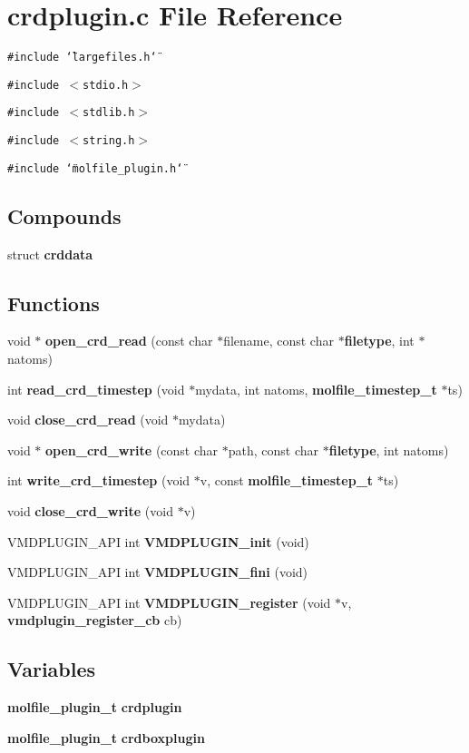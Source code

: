 \section{crdplugin.c File Reference}
\label{crdplugin_8c}
{\tt \#include \char`\"{}largefiles.h\char`\"{}}\par
{\tt \#include $<$stdio.h$>$}\par
{\tt \#include $<$stdlib.h$>$}\par
{\tt \#include $<$string.h$>$}\par
{\tt \#include \char`\"{}molfile\_\-plugin.h\char`\"{}}\par
\subsection*{Compounds}
\begin{CompactItemize}
\item 
struct {\bf crddata}
\end{CompactItemize}
\subsection*{Functions}
\begin{CompactItemize}
\item 
void $\ast$ {\bf open\_\-crd\_\-read} (const char $\ast$filename, const char $\ast${\bf filetype}, int $\ast$natoms)
\item 
int {\bf read\_\-crd\_\-timestep} (void $\ast$mydata, int natoms, {\bf molfile\_\-timestep\_\-t} $\ast$ts)
\item 
void {\bf close\_\-crd\_\-read} (void $\ast$mydata)
\item 
void $\ast$ {\bf open\_\-crd\_\-write} (const char $\ast$path, const char $\ast${\bf filetype}, int natoms)
\item 
int {\bf write\_\-crd\_\-timestep} (void $\ast$v, const {\bf molfile\_\-timestep\_\-t} $\ast$ts)
\item 
void {\bf close\_\-crd\_\-write} (void $\ast$v)
\item 
VMDPLUGIN\_\-API int {\bf VMDPLUGIN\_\-init} (void)
\item 
VMDPLUGIN\_\-API int {\bf VMDPLUGIN\_\-fini} (void)
\item 
VMDPLUGIN\_\-API int {\bf VMDPLUGIN\_\-register} (void $\ast$v, {\bf vmdplugin\_\-register\_\-cb} cb)
\end{CompactItemize}
\subsection*{Variables}
\begin{CompactItemize}
\item 
{\bf molfile\_\-plugin\_\-t} {\bf crdplugin}
\item 
{\bf molfile\_\-plugin\_\-t} {\bf crdboxplugin}
\end{CompactItemize}


